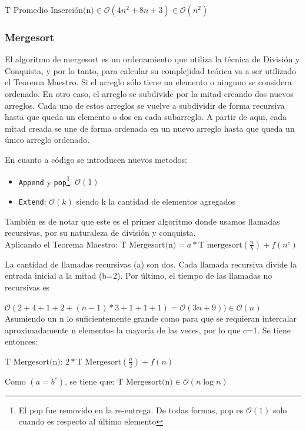 \documentclass[article,a4paper]{article}
\newcommand{\bigO}{\mathcal{O}}
\begin{document}
$\mbox{T Promedio Inserción(n)} \in \bigO(4n^2 + 8n + 3) \in \bigO(n^2)$

\subsubsection{Mergesort}

El algoritmo de mergesort es un ordenamiento que utiliza la técnica de División y Conquista, y por lo tanto, para calcular su complejidad teórica va a ser utilizado el Teorema Maestro. Si el arreglo sólo tiene un elemento o ninguno se considera ordenado. En otro caso, el arreglo se subdivide por la mitad creando dos nuevos arreglos. Cada uno de estos arreglos se vuelve a subdividir de forma recursiva hasta que queda un elemento o dos en cada subarreglo. A partir de aqui, cada mitad creada se une de forma ordenada en un nuevo arreglo hasta que queda un único arreglo ordenado.

En cuanto a código se introducen nuevos metodos:

\begin{itemize}
\item \texttt{Append} y \texttt{pop}\footnote{El pop fue removido en la re-entrega. De todas formas, pop es $\bigO(1)$ solo cuando es respecto al último elemento}: $\bigO(1)$
\item \texttt{Extend}: $\bigO(k)$ siendo k la cantidad de elementos agregados
\end{itemize}

También es de notar que este es el primer algoritmo donde usamos llamadas recursivas, por su naturaleza de división y conquista.\\

Aplicando el Teorema Maestro: $\mbox{T Mergesort(n)} = a * \mbox{T mergesort}(\frac{n}{b}) + f(n^c)$

La cantidad de llamadas recursivas (a) son dos. Cada llamada recursiva divide la entrada inicial a la mitad (b=2). Por último, el tiempo de las llamadas no recursivas es

$\bigO(2 + 4 + 1 + 2 + (n-1) * 3 + 1 + 1 + 1) = \bigO(3n + 9)) \in \bigO(n)$\\

Asumiendo un n lo suficientemente grande como para que se requieran intercalar aproximadamente n elementos la mayoría de las veces, por lo que c=1. Se tiene entonces:

$\mbox{T Mergesort(n): } 2 * \mbox{T Mergesort} (\frac{n}{2}) + f(n)$

Como $(a = b^c)$, se tiene que: $\mbox{T Mergesort(n)} \in \bigO(n \log n)$\\
\end{document}
